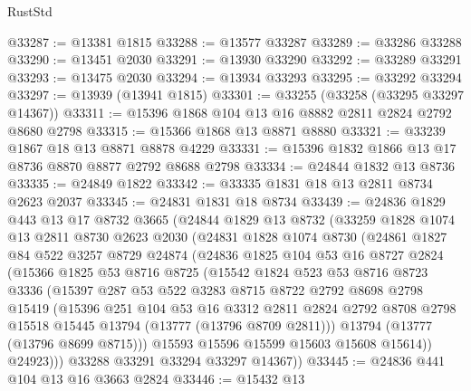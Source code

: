 \begin{lexlean}{RustStd}
\begin{coremodule}
@33287 := @13381 @1815
@33288 := @13577 @33287
@33289 := @33286 @33288
@33290 := @13451 @2030
@33291 := @13930 @33290
@33292 := @33289 @33291
@33293 := @13475 @2030
@33294 := @13934 @33293
@33295 := @33292 @33294
@33297 := @13939 (@13941 @1815)
@33301 := @33255 (@33258 (@33295 @33297 @14367))
@33311 := @15396 @1868 @104 @13 @16 @8882 @2811 @2824 @2792 @8680 @2798
@33315 := @15366 @1868 @13 @8871 @8880
@33321 := @33239 @1867 @18 @13 @8871 @8878 @4229
@33331 := @15396 @1832 @1866 @13 @17 @8736 @8870 @8877 @2792 @8688 @2798
@33334 := @24844 @1832 @13 @8736
@33335 := @24849 @1822
@33342 := @33335 @1831 @18 @13 @2811 @8734 @2623 @2037
@33345 := @24831 @1831 @18 @8734
@33439 := @24836
    @1829
    @443
    @13
    @17
    @8732
    @3665
    (@24844
      @1829
      @13
      @8732
      (@33259
        @1828
        @1074
        @13
        @2811
        @8730
        @2623
        @2030
        (@24831
          @1828
          @1074
          @8730
          (@24861
            @1827
            @84
            @522
            @3257
            @8729
            @24874
            (@24836
              @1825
              @104
              @53
              @16
              @8727
              @2824
              (@15366
                @1825
                @53
                @8716
                @8725
                (@15542
                  @1824
                  @523
                  @53
                  @8716
                  @8723
                  @3336
                  (@15397
                    @287
                    @53
                    @522
                    @3283
                    @8715
                    @8722
                    @2792
                    @8698
                    @2798
                    @15419
                    (@15396
                      @251
                      @104
                      @53
                      @16
                      @3312
                      @2811
                      @2824
                      @2792
                      @8708
                      @2798
                      @15518
                      @15445
                      @13794
                      (@13777 (@13796 @8709 @2811)))
                    @13794
                    (@13777 (@13796 @8699 @8715)))
                  @15593
                  @15596
                  @15599
                  @15603
                  @15608
                  @15614))
              @24923)))
        @33288
        @33291
        @33294
        @33297
        @14367))
@33445 := @24836 @441 @104 @13 @16 @3663 @2824
@33446 := @15432 @13

\end{coremodule}
\end{lexlean}
